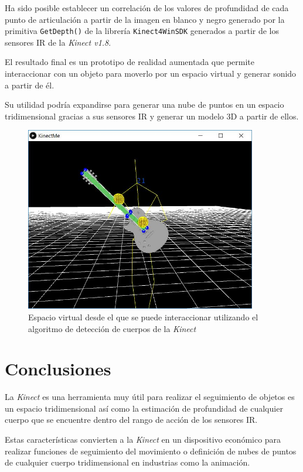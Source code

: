 \documentclass[10pt,a4paper]{report}
\begin{document}
	Ha sido posible establecer un correlación de los valores de profundidad de cada punto de articulación a partir de la imagen en blanco y negro generado por la primitiva \texttt{GetDepth()} de la librería \texttt{Kinect4WinSDK} generados a partir de los sensores IR de la \textit{Kinect v1.8}.
	
	El resultado final es un prototipo de realidad aumentada que permite interaccionar con un objeto para moverlo por un espacio virtual y generar sonido a partir de él. 
	
	Su utilidad podría expandirse para generar una nube de puntos en un espacio tridimensional gracias a sus sensores IR y generar un modelo 3D a partir de ellos.
		
	\begin{figure}[h]
		\centering
		\includegraphics[width=0.9\textwidth]{KinectMe.jpg}
		\caption{Espacio virtual desde el que se puede interaccionar utilizando el algoritmo de detección de cuerpos de la \textit{Kinect}}
	\end{figure}
	
	\chapter{Conclusiones}	
	La \textit{Kinect} es una herramienta muy útil para realizar el seguimiento de objetos es un espacio tridimensional así como la estimación de profundidad de cualquier cuerpo que se encuentre dentro del rango de acción de los sensores IR.
	
	Estas características convierten a la \textit{Kinect} en un dispositivo económico para realizar funciones de seguimiento del movimiento o definición de nubes de puntos de cualquier cuerpo tridimensional en industrias como la animación.
	
	
\end{document}
